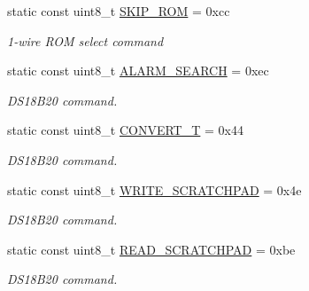 \begin{DoxyCompactItemize}
\mbox{\label{class_d_s2482_command_a8e22b0b3119b06052bc7235c1c6d1a4c}} 
static const uint8\+\_\+t \mbox{\hyperlink{class_d_s2482_command_a8e22b0b3119b06052bc7235c1c6d1a4c}{S\+K\+I\+P\+\_\+\+R\+OM}} = 0xcc
\begin{DoxyCompactList}\small\item\em 1-\/wire R\+OM select command \end{DoxyCompactList}\item 
\mbox{\label{class_d_s2482_command_ab2f234cc47c228763bcc06d24c4cef90}} 
static const uint8\+\_\+t \mbox{\hyperlink{class_d_s2482_command_ab2f234cc47c228763bcc06d24c4cef90}{A\+L\+A\+R\+M\+\_\+\+S\+E\+A\+R\+CH}} = 0xec
\begin{DoxyCompactList}\small\item\em D\+S18\+B20 command. \end{DoxyCompactList}\item 
\mbox{\label{class_d_s2482_command_aecc485ac4b99f1b75552aae1a3f98d70}} 
static const uint8\+\_\+t \mbox{\hyperlink{class_d_s2482_command_aecc485ac4b99f1b75552aae1a3f98d70}{C\+O\+N\+V\+E\+R\+T\+\_\+T}} = 0x44
\begin{DoxyCompactList}\small\item\em D\+S18\+B20 command. \end{DoxyCompactList}\item 
\mbox{\label{class_d_s2482_command_ad4eebcc44b7c144548245a5cc54d4cfe}} 
static const uint8\+\_\+t \mbox{\hyperlink{class_d_s2482_command_ad4eebcc44b7c144548245a5cc54d4cfe}{W\+R\+I\+T\+E\+\_\+\+S\+C\+R\+A\+T\+C\+H\+P\+AD}} = 0x4e
\begin{DoxyCompactList}\small\item\em D\+S18\+B20 command. \end{DoxyCompactList}\item 
\mbox{\label{class_d_s2482_command_af89bb64ce4210189165648c3142192ab}} 
static const uint8\+\_\+t \mbox{\hyperlink{class_d_s2482_command_af89bb64ce4210189165648c3142192ab}{R\+E\+A\+D\+\_\+\+S\+C\+R\+A\+T\+C\+H\+P\+AD}} = 0xbe
\begin{DoxyCompactList}\small\item\em D\+S18\+B20 command. \end{DoxyCompactList}\item 

\end{DoxyCompactItemize}
